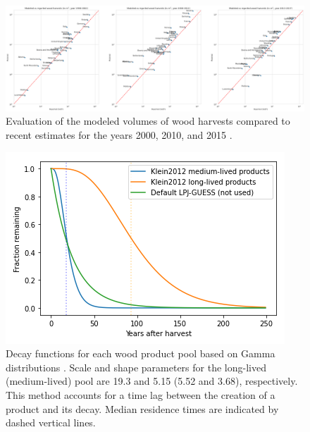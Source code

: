 \documentclass[]{article}
\begin{document}
\begin{figure}[h!]
	\centering
	\includegraphics[width=\linewidth]{supplement_figs/evalutation_wood_harv.png}
	\caption{Evaluation of the modeled volumes of wood harvests compared to recent estimates for the years 2000, 2010, and 2015 \parencite{FORESTEUROPE2020}.}
	\label{fig:eval-harvest-country}
\end{figure}




\begin{figure}[!h]
	\centering
	\includegraphics[width=0.5\linewidth]{supplement_figs/gamma_functions.png}
	\caption{Decay functions for each wood product pool based on Gamma distributions \parencite{Klein2013}. Scale and shape parameters for the long-lived (medium-lived) pool are 19.3 and 5.15 (5.52 and 3.68), respectively. This method accounts for a time lag between the creation of a product and its decay. Median residence times are indicated by dashed vertical lines.}
	\label{fig:gamma}
\end{figure}
\end{document}

